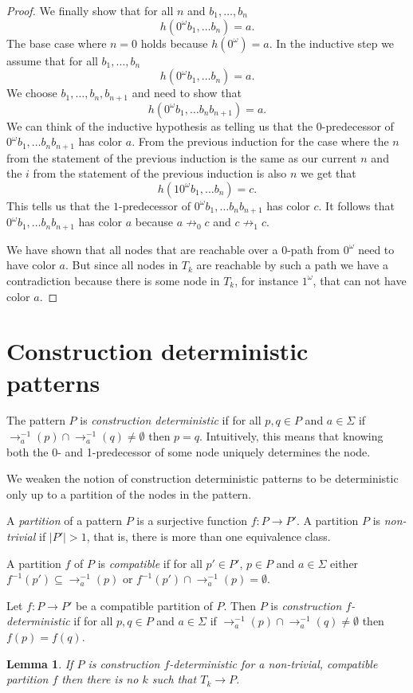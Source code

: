 \documentclass[a4paper]{article}
\newcommand{\prearrow}[1]{{\rightarrow_{#1}^{-1}}}
\newtheorem{lemma}[theorem]{Lemma}
\begin{document}
\begin{proof}
\medskip

We finally show that for all $n$ and $b_1,\dots,b_n$
\[
 h(0^\omega b_1,\dots b_n) = a.
\]
The base case where $n = 0$ holds because $h(0^\omega) = a$.
In the inductive step we assume that for all $b_1,\dots,b_n$
\[
 h(0^\omega b_1,\dots b_n) = a.
\]
We choose $b_1,\dots,b_n,b_{n + 1}$ and need to show that
\[
 h(0^\omega b_1,\dots b_n b_{n + 1}) = a.
\]
We can think of the inductive hypothesis as telling us that the
$0$-predecessor of $0^\omega b_1,\dots b_n b_{n + 1}$ has color $a$.
From the previous induction for the case where the $n$ from the
statement of the previous induction is the same as our current $n$ and
the $i$ from the statement of the previous induction is also $n$ we get
that
\[
 h(1 0^\omega b_1,\dots b_n) = c.
\]
This tells us that the $1$-predecessor of $0^\omega b_1,\dots b_n b_{n +
1}$ has color $c$. It follows that $0^\omega b_1,\dots b_n b_{n +
1}$ has color $a$ because $a \not \rightarrow_0 c$ and $c \not
\rightarrow_1 c$.

\medskip

We have shown that all nodes that are reachable over a $0$-path from
$0^\omega$ need to have color $a$. But since all nodes in $T_k$ are
reachable by such a path we have a contradiction because there is some
node in $T_k$, for instance $1^\omega$, that can not have color $a$.
\end{proof}


\section{Construction deterministic patterns}

The pattern $P$ is \emph{construction deterministic} if for all $p,q \in
P$ and $a \in \Sigma$ if $\prearrow{a}(p) \cap \prearrow{a}(q) \neq
\emptyset$ then $p = q$. Intuitively, this means that knowing both the
0- and 1-predecessor of some node uniquely determines the node.

We weaken the notion of construction deterministic patterns to be
deterministic only up to a partition of the nodes in the pattern.

A \emph{partition} of a pattern $P$ is a surjective function $f : P \to
P'$. A partition $P$ is \emph{non-trivial} if $|P'| > 1$, that is, there
is more than one equivalence class.

A partition $f$ of $P$ is \emph{compatible} if for all $p' \in P'$, $p
\in P$ and $a \in \Sigma$ either $f^{-1}(p') \subseteq \prearrow{a}(p)$
or $f^{-1}(p') \cap \prearrow{a}(p) = \emptyset$.

Let $f : P \to P'$ be a compatible partition of $P$. Then $P$ is
\emph{construction $f$-deterministic} if for all $p,q \in P$ and $a \in
\Sigma$ if $\prearrow{a}(p) \cap \prearrow{a}(q) \neq \emptyset$ then
$f(p) = f(q)$.

\begin{lemma} \label{killer lemma}
 If $P$ is construction $f$-deterministic for a non-trivial, compatible
partition $f$ then there is no $k$ such that $T_k \to P$.
\end{lemma}
\end{document}
